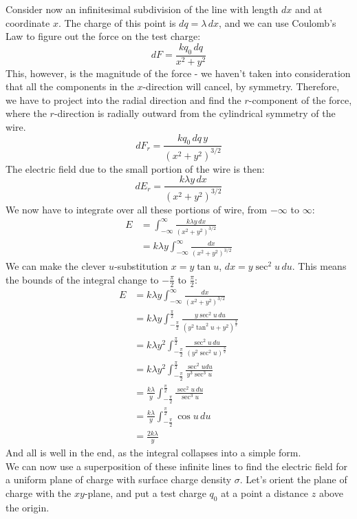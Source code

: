 Consider now an infinitesimal subdivision of the line with length $dx$ and at coordinate $x$. The charge of this point is $dq = \lambda \, dx$, and we can use Coulomb's Law to figure out the force on the test charge:
\[
	dF = \frac{kq_0\, dq}{x^2 + y^2}
\]
This, however, is the magnitude of the force - we haven't taken into consideration that all the components in the $x$-direction will cancel, by symmetry. Therefore, we have to project into the radial direction and find the $r$-component of the force, where the $r$-direction is radially outward from the cylindrical symmetry of the wire. 
\[
	dF_r = \frac{kq_0 \, dq \, y}{(x^2 + y^2)^{3/2}}
\]
The electric field due to the small portion of the wire is then:
\[
	dE_r = \frac{k\lambda y \, dx}{(x^2+y^2)^{3/2}}
\]
We now have to integrate over all these portions of wire, from $-\infty$ to $\infty$:
\begin{align*}
	E &= \int_{-\infty}^{\infty} \frac{k\lambda y \, dx}{(x^2+y^2)^{3/2}}\\
	&= k\lambda y  \int_{-\infty}^{\infty} \frac{dx}{(x^2+y^2)^{3/2}}
\end{align*}
We can make the clever $u$-substitution $x = y \tan u$, $dx = y \sec^2 u \, du$. This means the bounds of the integral change to $-\frac{\pi}{2}$ to $\frac{\pi}{2}$:
\begin{align*}
	E &= k\lambda y  \int_{-\infty}^{\infty} \frac{dx}{(x^2+y^2)^{3/2}} \\
	&= k \lambda y \int_{- \frac{\pi}{2}}^{\frac{\pi}{2}} \frac{y \sec^2 u \, du}{(y^2 \tan^2 u + y^2)^{\frac{3}{2}}}\\
	&= k \lambda y^2 \int_{- \frac{\pi}{2}}^{\frac{\pi}{2}} \frac{\sec^2 u \, du}{(y^2 \sec^2 u)^{\frac{3}{2}}} \\
	&= k \lambda y^2 \int_{- \frac{\pi}{2}}^{\frac{\pi}{2}} \frac{\sec^2 u du}{y^3 \sec^3 u} \\
	&= \frac{k \lambda}{y} \int_{- \frac{\pi}{2}}^{\frac{\pi}{2}} \frac{\sec^2 u \, du}{\sec^3 u}\\
	&= \frac{k \lambda}{y} \int_{- \frac{\pi}{2}}^{\frac{\pi}{2}} \cos  u \, du \\
	&= \frac{2 k \lambda}{y}
\end{align*}
And all is well in the end, as the integral collapses into a simple form.\\
We can now use a superposition of these infinite lines to find the electric field for a uniform plane of charge with surface charge density $\sigma$. Let's orient the plane of charge with the $xy$-plane, and put a test charge $q_0$ at a point a distance $z$ above the origin. \\
